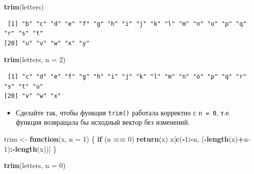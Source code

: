 \documentclass[
]{book}
\newenvironment{Shaded}{\begin{snugshade}}{\end{snugshade}}
\newcommand{\ControlFlowTok}[1]{\textcolor[rgb]{0.13,0.29,0.53}{\textbf{#1}}}
\newcommand{\DataTypeTok}[1]{\textcolor[rgb]{0.13,0.29,0.53}{#1}}
\newcommand{\DecValTok}[1]{\textcolor[rgb]{0.00,0.00,0.81}{#1}}
\newcommand{\KeywordTok}[1]{\textcolor[rgb]{0.13,0.29,0.53}{\textbf{#1}}}
\newcommand{\NormalTok}[1]{#1}
\newcommand{\OperatorTok}[1]{\textcolor[rgb]{0.81,0.36,0.00}{\textbf{#1}}}
\newcommand{\StringTok}[1]{\textcolor[rgb]{0.31,0.60,0.02}{#1}}
\providecommand{\tightlist}{%
  \setlength{\itemsep}{0pt}\setlength{\parskip}{0pt}}
\begin{document}
\begin{Shaded}
\begin{Highlighting}[]
\KeywordTok{trim}\NormalTok{(letters)}
\end{Highlighting}
\end{Shaded}

\begin{verbatim}
 [1] "b" "c" "d" "e" "f" "g" "h" "i" "j" "k" "l" "m" "n" "o" "p" "q" "r" "s" "t"
[20] "u" "v" "w" "x" "y"
\end{verbatim}

\begin{Shaded}
\begin{Highlighting}[]
\KeywordTok{trim}\NormalTok{(letters, }\DataTypeTok{n =} \DecValTok{2}\NormalTok{)}
\end{Highlighting}
\end{Shaded}

\begin{verbatim}
 [1] "c" "d" "e" "f" "g" "h" "i" "j" "k" "l" "m" "n" "o" "p" "q" "r" "s" "t" "u"
[20] "v" "w" "x"
\end{verbatim}

\begin{itemize}
\tightlist
\item
  Сделайте так, чтобы функция \texttt{trim()} работала корректно с \texttt{n\ =\ 0}, т.е. функция возвращала бы исходный вектор без изменений.
\end{itemize}

\begin{Shaded}
\begin{Highlighting}[]
\NormalTok{trim <-}\StringTok{ }\ControlFlowTok{function}\NormalTok{(x, }\DataTypeTok{n =} \DecValTok{1}\NormalTok{) \{}
  \ControlFlowTok{if}\NormalTok{ (n }\OperatorTok{==}\StringTok{ }\DecValTok{0}\NormalTok{) }\KeywordTok{return}\NormalTok{(x)}
\NormalTok{  x[}\KeywordTok{c}\NormalTok{(}\OperatorTok{-}\DecValTok{1}\OperatorTok{:-}\NormalTok{n, (}\OperatorTok{-}\KeywordTok{length}\NormalTok{(x)}\OperatorTok{+}\NormalTok{n}\DecValTok{-1}\NormalTok{)}\OperatorTok{:-}\KeywordTok{length}\NormalTok{(x))]}
\NormalTok{\}}
\end{Highlighting}
\end{Shaded}

\begin{Shaded}
\begin{Highlighting}[]
\KeywordTok{trim}\NormalTok{(letters, }\DataTypeTok{n =} \DecValTok{0}\NormalTok{)}
\end{Highlighting}
\end{Shaded}
\end{document}
